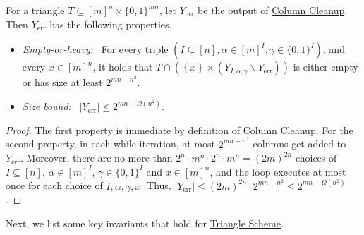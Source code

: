 \documentclass{toc}
\newcommand{\trischeme}{\hyperref[alg:tri-partition]{Triangle Scheme}\xspace}
\newcommand{\columnclean}{\hyperref[alg:column-cleanup]{Column Cleanup}\xspace}
\DeclareMathOperator{\err}{err}
\newcommand{\allX}{[m]^n}
\newcommand{\allY}{\{0,1\}^{mn}}
\newcommand{\set}[1]{\left \{ #1 \right \}}
\newcommand{\bit}{\{0,1\}}
\begin{document}
\begin{claim}\label{clm:col-clean}
For a triangle $T \subseteq \allX \times \allY$, let $Y_{\err}$ be the output of \columnclean. 
%
%
%
%
Then $Y_{\err}$ has the following properties. %
\begin{itemize}
	\item \emph{Empty-or-heavy:}~ For every triple $(I \subseteq [n], \alpha \in [m]^I, \gamma \in \bit^I)$, and every $x \in \allX$, it holds that $T \cap (\set{x} \times (Y_{I,\alpha,\gamma}\smallsetminus Y_{\err}))$ is either empty or has size at least $2^{mn-n^2}$.
	\item \emph{Size bound:}~ $|Y_{\err}| \le 2^{mn - \Omega(n^2)}$.
\end{itemize}
\end{claim}
\begin{proof}
The first property is immediate by definition of \columnclean. For the second property, in each while-iteration, at most $2^{mn-n^2}$ columns get added to $Y_{\err}$. Moreover, there are no more than $2^n \cdot m^n \cdot 2^n \cdot m^n = (2m)^{2n}$ choices of $I\subseteq [n]$, $\alpha \in [m]^I$, $\gamma \in \bit^I$ and $x \in [m]^n$, and the loop executes at most once for each choice of $I, \alpha, \gamma, x$. Thus, $|Y_{\err}| \le (2m)^{2n} \cdot 2^{mn - n^2} \le 2^{mn - \Omega(n^2)}$.
\end{proof}

Next, we list some key invariants that hold for \trischeme. 
\end{document}
